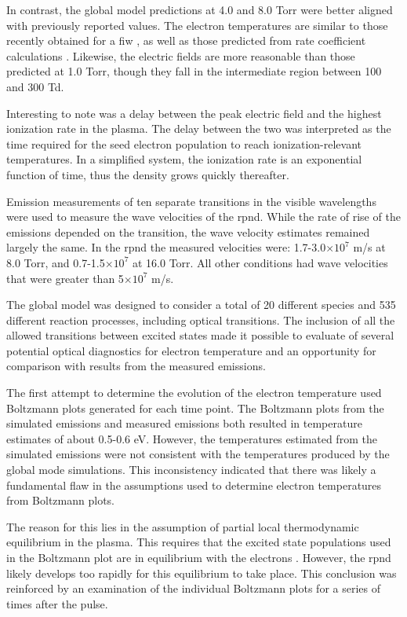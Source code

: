 In contrast, the global model predictions at 4.0 and 8.0 Torr were better
aligned with previously reported values. The electron temperatures are similar
to those recently obtained for a \acs{fiw} \cite{Takashima2011}, as well as
those predicted from rate coefficient calculations \cite{Aleksandrov2007}.
Likewise, the electric fields are more reasonable than those predicted at 1.0
Torr, though they fall in the intermediate region between 100 and 300 Td.

Interesting to note was a delay between the peak electric field and the highest
ionization rate in the plasma. The delay between the two was interpreted as the
time required for the seed electron population to reach ionization-relevant
temperatures. In a simplified system, the ionization rate is an exponential
function of time, thus the density grows quickly thereafter.

Emission measurements of ten separate transitions in the visible wavelengths
were used to measure the wave velocities of the \acs{rpnd}. While the rate of
rise of the emissions depended on the transition, the wave velocity estimates
remained largely the same. In the \acs{rpnd} the measured velocities were:
1.7-3.0$\times10^7$ m/s at 8.0 Torr, and 0.7-1.5$\times10^7$ at 16.0 Torr. All
other conditions had wave velocities that were greater than 5$\times10^7$ m/s.

The global model was designed to consider a total of 20 different species and
535 different reaction processes, including optical transitions. The inclusion
of all the allowed transitions between excited states made it possible to
evaluate of several potential optical diagnostics for electron temperature and
an opportunity for comparison with results from the measured emissions.

The first attempt to determine the evolution of the electron temperature used
Boltzmann plots generated for each time point. The Boltzmann plots from the
simulated emissions and measured emissions both resulted in temperature
estimates of about 0.5-0.6 eV. However, the temperatures estimated from the
simulated emissions were not consistent with the temperatures produced by the
global mode simulations. This inconsistency indicated that there was likely a
fundamental flaw in the assumptions used to determine electron temperatures from
Boltzmann plots.

The reason for this lies in the assumption of partial local thermodynamic
equilibrium in the plasma. This requires that the excited state populations used
in the Boltzmann plot are in equilibrium with the electrons \cite{Kunze2009}.
However, the \acs{rpnd} likely develops too rapidly for this equilibrium to take
place. This conclusion was reinforced by an examination of the individual
Boltzmann plots for a series of times after the pulse.

